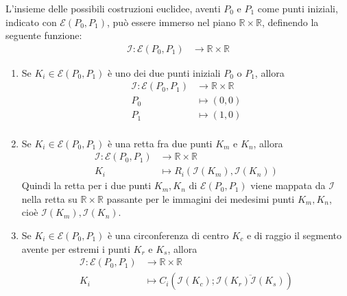\begin{definizione} \label{immers}
L'insieme delle possibili costruzioni euclidee, aventi $P_0$ e $P_1$ come punti iniziali, indicato con $\mathcal{E}(P_0,P_1)$, può essere immerso nel piano $\mathbb{R}\times\mathbb{R}$, definendo la seguente funzione:
\begin{align*} 
\mathcal{I}:  \mathcal{E}(P_0,P_1) & \longrightarrow \mathbb{R}\times\mathbb{R} 
\end{align*}
\begin{enumerate}

\item Se $K_{i} \in \mathcal{E}(P_0,P_1) $ è uno dei due punti iniziali $P_0$ o $P_1$, allora 
\begin{align*} 
\mathcal{I}:  \mathcal{E}(P_0,P_1) & \longrightarrow \mathbb{R}\times\mathbb{R} \\
P_0 & \longmapsto (0,0) \\
P_1 & \longmapsto (1,0) \\
\end{align*}

\item Se $K_{i} \in \mathcal{E}(P_0,P_1)$ è una retta fra due punti $K_{m}$ e $K_{n}$, allora 
\begin{align*} 
\mathcal{I}:  \mathcal{E}(P_0,P_1) & \longrightarrow \mathbb{R}\times\mathbb{R} \\
K_{i}  & \longmapsto R_{i} (  \mathcal{I} (K_{m}), \mathcal{I}(K_{n}) ) 
\end{align*}
Quindi la retta per i due punti $K_{m}, K_{n}$ di $\mathcal{E}(P_0,P_1)$ viene mappata da $ \mathcal{I}$ nella retta su $\mathbb{R}\times\mathbb{R}$ passante per le immagini dei medesimi punti $K_{m}, K_{n} $, cioè $ \mathcal{I} (K_{m}), \mathcal{I}(K_{n}) $.

\item Se $K_{i} \in \mathcal{E}(P_0,P_1)$ è una circonferenza di centro $K_{c}$ e di raggio il segmento avente per estremi i punti $K_{r}$ e $K_{s}$, allora 
\begin{align*} 
\mathcal{I}:  \mathcal{E}(P_0,P_1) & \longrightarrow \mathbb{R}\times\mathbb{R} \\
K_{i}  & \longmapsto C_{i} (  \mathcal{I} (K_{c}); \overline{  \mathcal{I}(K_{r}) \mathcal{I}(K_{s})})
\end{align*}


\end{enumerate}
\end{definizione}

